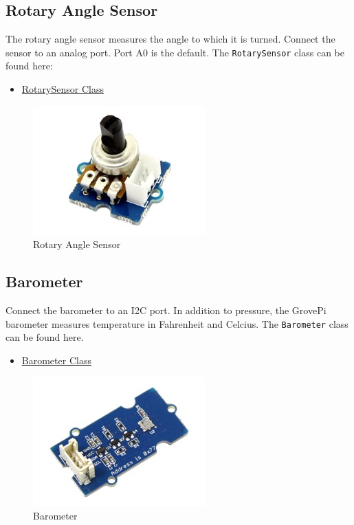 \subsection{Rotary Angle Sensor}\label{rotary-angle-sensor}

The rotary angle sensor measures the angle to which it is turned.
Connect the sensor to an analog port. Port A0 is the default. The
\texttt{RotarySensor} class can be found here:

\begin{itemize}
\tightlist
\item
  \href{https://github.com/cloudmesh/cloudmesh.pi/blob/master/cloudmesh/pi/rotary.py}{RotarySensor
  Class}
\end{itemize}

\begin{figure}
\centering
\includegraphics{../images/grovepi/rotary.jpg}
\caption{Rotary Angle Sensor}
\end{figure}

\subsection{Barometer}\label{barometer}

Connect the barometer to an I2C port. In addition to pressure, the
GrovePi barometer measures temperature in Fahrenheit and Celcius. The
\texttt{Barometer} class can be found here.

\begin{itemize}
\tightlist
\item
  \href{https://github.com/cloudmesh/cloudmesh.pi/blob/master/cloudmesh/pi/barometer.py}{Barometer
  Class}
\end{itemize}

\begin{figure}
\centering
\includegraphics{../images/grovepi/barometer.jpg}
\caption{Barometer}
\end{figure}

